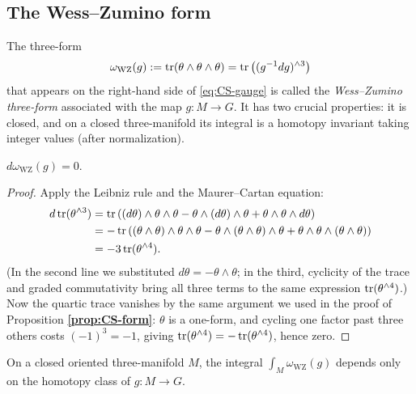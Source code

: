 \subsection{The Wess--Zumino form}

The three-form
\begin{equation}\label{eq:WZ-form}
\omega_{\text{WZ}}(g) := \operatorname{tr}(\theta\wedge\theta\wedge\theta) = \operatorname{tr}\left((g^{-1}dg)^{\wedge 3}\right)
\end{equation}
that appears on the right-hand side of \eqref{eq:CS-gauge} is called the \emph{Wess--Zumino three-form} associated with the map $g:M\to G$. It has two crucial properties: it is closed, and on a closed three-manifold its integral is a homotopy invariant taking integer values (after normalization).

\begin{lemma}\label{lem:WZ-closed}
$d\omega_{\text{WZ}}(g) = 0$.
\end{lemma}

\begin{proof}
Apply the Leibniz rule and the Maurer--Cartan equation:
\begin{align*}
d\operatorname{tr}(\theta^{\wedge 3}) &= \operatorname{tr}\left((d\theta)\wedge\theta\wedge\theta - \theta\wedge(d\theta)\wedge\theta + \theta\wedge\theta\wedge d\theta\right) \\
&= -\operatorname{tr}\left((\theta\wedge\theta)\wedge\theta\wedge\theta - \theta\wedge(\theta\wedge\theta)\wedge\theta + \theta\wedge\theta\wedge(\theta\wedge\theta)\right) \\
&= -3\operatorname{tr}(\theta^{\wedge 4}).
\end{align*}
(In the second line we substituted $d\theta = -\theta\wedge\theta$; in the third, cyclicity of the trace and graded commutativity bring all three terms to the same expression $\operatorname{tr}(\theta^{\wedge 4})$.) Now the quartic trace vanishes by the same argument we used in the proof of Proposition \textbf{\ref{prop:CS-form}}: $\theta$ is a one-form, and cycling one factor past three others costs $(-1)^3 = -1$, giving $\operatorname{tr}(\theta^{\wedge 4}) = -\operatorname{tr}(\theta^{\wedge 4})$, hence zero.
\end{proof}

\begin{corollary}\label{cor:WZ-homotopy}
On a closed oriented three-manifold $M$, the integral $\int_M \omega_{\text{WZ}}(g)$ depends only on the homotopy class of $g:M\to G$.
\end{corollary}

